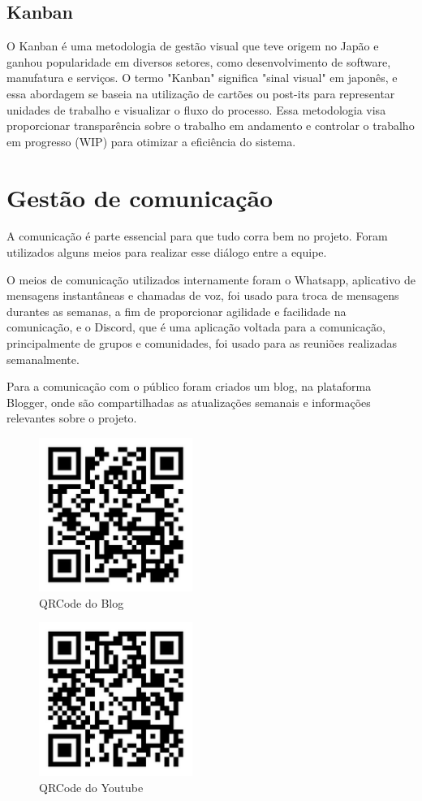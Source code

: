 \subsection{Kanban}
O Kanban é uma metodologia de gestão visual que teve origem no Japão e ganhou popularidade em diversos setores, como desenvolvimento de software, manufatura e serviços. O termo "Kanban" significa "sinal visual" em japonês, e essa abordagem se baseia na utilização de cartões ou post-its para representar unidades de trabalho e visualizar o fluxo do processo. Essa metodologia visa proporcionar transparência sobre o trabalho em andamento e controlar o trabalho em progresso (WIP) para otimizar a eficiência do sistema.

\section{Gestão de comunicação}
A comunicação é parte essencial para que tudo corra bem no projeto. Foram utilizados alguns meios para realizar esse diálogo entre a equipe.

O meios de comunicação utilizados internamente foram o  Whatsapp, aplicativo de mensagens instantâneas  e chamadas de voz, foi usado para troca de mensagens durantes as semanas, a fim de proporcionar agilidade e facilidade na comunicação, e o Discord, que é uma aplicação voltada para a comunicação, principalmente de grupos e comunidades, foi usado para as reuniões realizadas semanalmente.

Para a comunicação com o público foram criados um blog, na plataforma Blogger, onde são compartilhadas as atualizações semanais e informações relevantes sobre o projeto.

 \begin{figure}[!htb]
 	    \centering
 	    \caption{\label{logo}QRCode do Blog}
 	    \includegraphics[width=5cm]{img/qrcode-blog.png}
\end{figure}
\FloatBarrier

 \begin{figure}[!htb]
 	    \centering
 	    \caption{\label{logo}QRCode do Youtube}
 	    \includegraphics[width=5cm]{img/qrcode-youtube.png}
\end{figure}
\FloatBarrier

